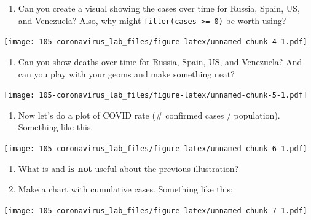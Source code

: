 \documentclass[
]{book}
\newenvironment{Shaded}{\begin{snugshade}}{\end{snugshade}}
\newcommand{\CommentTok}[1]{\textcolor[rgb]{0.56,0.35,0.01}{\textit{#1}}}
\newcommand{\FunctionTok}[1]{\textcolor[rgb]{0.00,0.00,0.00}{#1}}
\newcommand{\NormalTok}[1]{#1}
\newcommand{\SpecialCharTok}[1]{\textcolor[rgb]{0.00,0.00,0.00}{#1}}
\providecommand{\tightlist}{%
  \setlength{\itemsep}{0pt}\setlength{\parskip}{0pt}}
\begin{document}
\begin{Shaded}
\end{Shaded}

\begin{enumerate}
\def\labelenumi{\arabic{enumi}.}
\tightlist
\item
  Can you create a visual showing the cases over time for Russia, Spain, US, and Venezuela?
  Also, why might \texttt{filter(cases\ \textgreater{}=\ 0)} be worth using?
\end{enumerate}

\texttt{[image: 105-coronavirus\_lab\_files/figure-latex/unnamed-chunk-4-1.pdf]}

\begin{enumerate}
\def\labelenumi{\arabic{enumi}.}
\setcounter{enumi}{1}
\tightlist
\item
  Can you show deaths over time for Russia, Spain, US, and Venezuela? And can you play with your geoms and make something neat?
\end{enumerate}

\texttt{[image: 105-coronavirus\_lab\_files/figure-latex/unnamed-chunk-5-1.pdf]}

\begin{enumerate}
\def\labelenumi{\arabic{enumi}.}
\setcounter{enumi}{2}
\tightlist
\item
  Now let's do a plot of COVID rate (\# confirmed cases / population). Something like this.
\end{enumerate}

\texttt{[image: 105-coronavirus\_lab\_files/figure-latex/unnamed-chunk-6-1.pdf]}

\begin{enumerate}
\def\labelenumi{\arabic{enumi}.}
\setcounter{enumi}{3}
\item
  What is and \textbf{is not} useful about the previous illustration?
\item
  Make a chart with cumulative cases. Something like this:
\end{enumerate}

\texttt{[image: 105-coronavirus\_lab\_files/figure-latex/unnamed-chunk-7-1.pdf]}
\end{document}
